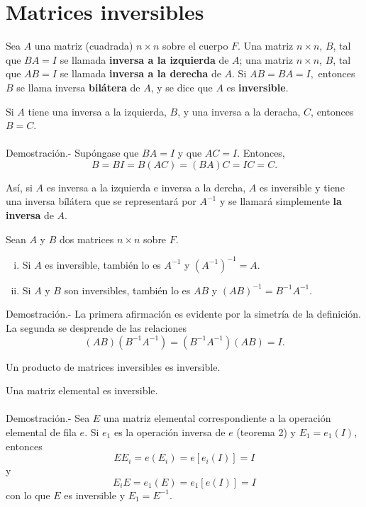 \section{Matrices inversibles}

\begin{def.}
    Sea $A$ una matriz (cuadrada) $n\times n$ sobre el cuerpo $F$. Una matriz $n\times n$, $B$, tal que $BA=I$ se llamada \textbf{inversa a la izquierda} de $A$; una matriz $n\times n$, $B$, tal que $AB=I$ se llamada \textbf{inversa a la derecha} de $A$. Si $AB=BA=I,$ entonces $B$ se llama inversa \textbf{bilátera} de $A$, y se dice que $A$ es \textbf{inversible}.
\end{def.}

\begin{lema}
    Si $A$ tiene una inversa a la izquierda, $B$, y una inversa a la deracha, $C$, entonces $B=C$.\\\\
	Demostración.-\; Supóngase que $BA=I$ y que $AC=I$. Entonces,
	$$B=BI=B(AC)=(BA)C=IC=C.$$
\end{lema}

Así, si $A$ es inversa a la izquierda e inversa a la dercha, $A$ es inversible y tiene una inversa bílátera que se representará por $A^{-1}$ y se llamará simplemente \textbf{la inversa} de $A$.

\begin{teo}
    Sean $A$ y $B$ dos matrices $n\times n$ sobre $F$.

    \begin{enumerate}[(i)]
	\item Si $A$ es inversible, también lo es $A^{-1}$ y $\left(A^{-1}\right)^{-1}=A.$
	\item Si $A$ y $B$ son inversibles, también lo es $AB$ y $(AB)^{-1}=B^{-1}A^{-1}.$\\
    \end{enumerate}
	Demostración.-\; La primera afirmación es evidente por la simetría de la definición. La segunda se desprende de las relaciones 
	$$(AB)\left(B^{-1}A^{-1}\right)=\left(B^{-1}A^{-1}\right)(AB)=I.$$
\end{teo}

\begin{cor}
    Un producto de matrices inversibles es inversible.
\end{cor}

\begin{teo}
    Una matriz elemental es inversible.\\\\
    	Demostración.-\; Sea $E$ una matriz elemental correspondiente a la operación elemental de fila $e$. Si $e_1$ es la operación inversa de $e$ (teorema 2) y $E_1=e_1(I)$, entonces
	$$EE_i=e(E_i)=e\left[e_i(I)\right]=I$$
	y
	$$E_iE=e_1(E)=e_1\left[e(I)\right]=I$$
	con lo que $E$ es inversible y $E_1=E^{-1}.$
\end{teo}

